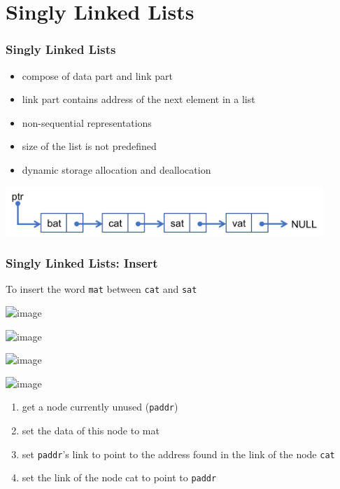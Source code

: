 \documentclass[newPxFont,sthlmFooter,nooffset]{beamer}
\begin{document}
\section{Singly Linked Lists}
\begin{frame}[t]
  \frametitle{Singly Linked Lists}
  \begin{itemize}
  \item compose of data part and link part
  \item link part contains address of the
next element in a list
  \item non-sequential representations
  \item size of the list is not predefined
  \item dynamic storage allocation and deallocation
  \end{itemize}

\includegraphics[width=0.9\textwidth]{figures/fig01_single.png}
\end{frame}

\begin{frame}[t]
  \frametitle{Singly Linked Lists: Insert}
  To insert the word \texttt{mat} between \texttt{cat} and \texttt{sat}

\includegraphics<2>[width=0.9\textwidth]{figures/fig02_single_insert.png}

\includegraphics<3>[width=0.9\textwidth]{figures/fig02_single_insert1.png}

\includegraphics<4>[width=0.9\textwidth]{figures/fig02_single_insert2.png}

\includegraphics<5>[width=0.9\textwidth]{figures/fig02_single_insert3.png}


\begin{enumerate}
\item<2-> get a node currently unused (\texttt{paddr})
\item<3-> set the data of this node to mat
\item<4-> set \texttt{paddr}'s link to point to the address found in the link of
  the node \texttt{cat}
\item<5-> set the link of the node cat to point to \texttt{paddr}

\end{enumerate}
\end{frame}
\end{document}
